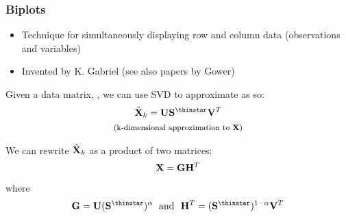 \documentclass{beamer}
\begin{document}






\begin{frame}
  \frametitle{Biplots}

\begin{itemize}
  \item Technique for simultaneously displaying row and column data (observations and variables)
  \item Invented by K. Gabriel (see also papers by Gower)
\end{itemize}

Given a data matrix, , we can use SVD to approximate  as so:
\begin{gather*}
  \tilde{\Mtx{X}}_k =  \Mtx{U}\Mtx{S}^{\thinstar} \Mtx{V}^T \\
  \text{\footnotesize (k-dimensional approximation to \Mtx{X})}
\end{gather*}


We can rewrite $\tilde{\mathbf{X}}_k$ as a product of two matrices:
\[
  \mathbf{X} = \mathbf{G}\mathbf{H}^T
\]
where
\[
  \Mtx{G} = \Mtx{U}(\Mtx{S}^{\thinstar})^\alpha\; \text{ and } \ \Mtx{H}^T = (\Mtx{S}^{\thinstar})^{1-\alpha}\Mtx{V}^T
\]
\end{frame}

\end{document}
